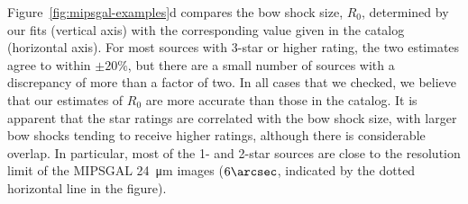 \documentclass[useAMS, usenatbib, a4paper]{mnras}
\begin{document}
Figure~\ref{fig:mipsgal-examples}d compares the bow shock size,
\(R_0\), determined by our fits (vertical axis) with the corresponding
value given in the \citet{Kobulnicky:2016a} catalog (horizontal axis).
For most sources with 3-star or higher rating, the two estimates agree
to within \(\pm 20\%\), but there are a small number of sources with a
discrepancy of more than a factor of two.  In all cases that we
checked, we believe that our estimates of \(R_0\) are more accurate
than those in the catalog.  It is apparent that the star ratings are
correlated with the bow shock size, with larger bow shocks tending to
receive higher ratings, although there is considerable overlap.  In
particular, most of the 1- and 2-star sources are close to the
resolution limit of the MIPSGAL \SI{24}{\um} images (\(6\arcsec\),
indicated by the dotted horizontal line in the figure).
\end{document}

